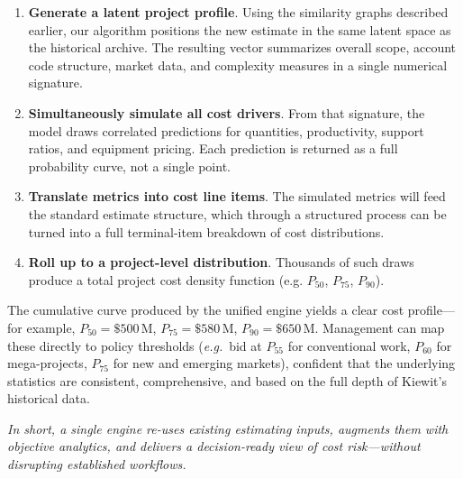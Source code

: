 \documentclass[12pt, a4paper]{article} %
\begin{document}
\begin{enumerate}
  \item \textbf{Generate a latent project profile}.
        Using the similarity graphs described earlier, our algorithm positions the new estimate in the same latent space as the historical archive. The resulting vector summarizes overall scope, account code structure, market data, and complexity measures in a single numerical signature.
  \item \textbf{Simultaneously simulate all cost drivers}.
        From that signature, the model draws correlated predictions for quantities, productivity, support ratios, and equipment pricing.  Each prediction is returned as a full probability curve, not a single point.
  \item \textbf{Translate metrics into cost line items}.
        The simulated metrics will feed the standard estimate structure, which through a structured process can be turned into a full terminal-item breakdown of cost distributions.
  \item \textbf{Roll up to a project-level distribution}.
        Thousands of such draws produce a total project cost density function (e.g. $P_{50}$, $P_{75}$, $P_{90}$).
\end{enumerate}

The cumulative curve produced by the unified engine yields a clear cost profile—for example,
$P_{50}= \$500\,\text{M}$,\;
$P_{75}= \$580\,\text{M}$,\;
$P_{90}= \$650\,\text{M}$. 
Management can map these directly to policy thresholds (\emph{e.g.}\ bid at $P_{55}$ for conventional work, $P_{60}$ for mega-projects, $P_{75}$ for new and emerging markets), confident that the underlying statistics are consistent, comprehensive, and based on the full depth of Kiewit’s historical data.

\bigskip
\noindent\emph{In short, a single engine re-uses existing estimating
inputs, augments them with objective analytics, and delivers a
decision-ready view of cost risk—without disrupting established workflows.}



\printbibliography[title={Bibliography}] %

\end{document}
